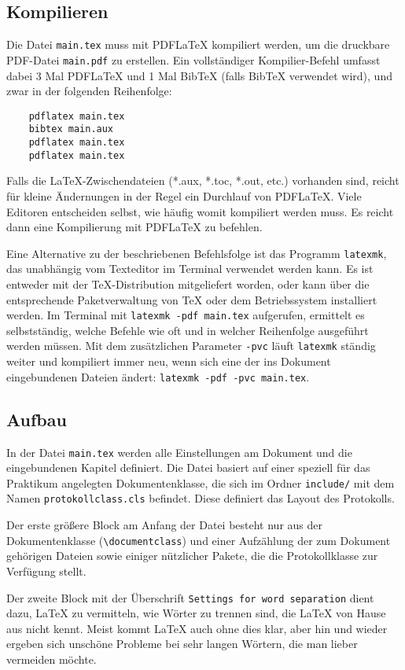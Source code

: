 \subsection{Kompilieren}
Die Datei \verb|main.tex| muss mit PDFLaTeX kompiliert werden, um die druckbare PDF-Datei \verb|main.pdf| zu erstellen. Ein vollständiger Kompilier-Befehl umfasst dabei 3 Mal PDFLaTeX und 1 Mal BibTeX (falls BibTeX verwendet wird), und zwar in der folgenden Reihenfolge:

\begin{verbatim}
	pdflatex main.tex
	bibtex main.aux
	pdflatex main.tex
	pdflatex main.tex
\end{verbatim}

Falls die LaTeX-Zwischendateien (*.aux, *.toc, *.out, etc.) vorhanden sind, reicht für kleine Ändernungen in der Regel ein Durchlauf von PDFLaTeX. Viele Editoren entscheiden selbst, wie häufig womit kompiliert werden muss. Es reicht dann eine Kompilierung mit PDFLaTeX zu befehlen.

Eine Alternative zu der beschriebenen Befehlsfolge ist das Programm
\verb|latexmk|, das unabhängig vom Texteditor im Terminal verwendet
werden kann.
Es ist entweder mit der TeX-Distribution mitgeliefert worden, oder kann über
die entsprechende Paketverwaltung von TeX oder dem Betriebssystem installiert
werden.
Im Terminal mit \verb|latexmk -pdf main.tex| aufgerufen, ermittelt es
selbstständig, welche Befehle wie oft und in welcher Reihenfolge ausgeführt
werden müssen.
Mit dem zusätzlichen Parameter \verb|-pvc| läuft \verb|latexmk| ständig weiter
und kompiliert immer neu, wenn sich eine der ins Dokument eingebundenen Dateien
ändert: \verb|latexmk -pdf -pvc main.tex|.

\subsection{Aufbau}
In der Datei \verb|main.tex| werden alle Einstellungen am Dokument und die eingebundenen Kapitel definiert. Die Datei basiert auf einer speziell für das Praktikum angelegten Dokumentenklasse, die sich im Ordner \verb|include/| mit dem Namen \verb|protokollclass.cls| befindet. Diese definiert das Layout des Protokolls.

Der erste größere Block am Anfang der Datei besteht nur aus der Dokumentenklasse (\verb|\documentclass|) und einer Aufzählung der zum Dokument gehörigen Dateien sowie einiger nützlicher Pakete, die die Protokollklasse zur Verfügung stellt.

Der zweite Block mit der Überschrift \verb|Settings for word separation| dient dazu, LaTeX zu vermitteln, wie Wörter zu trennen sind, die LaTeX von Hause aus nicht kennt. Meist kommt LaTeX auch ohne dies klar, aber hin und wieder ergeben sich unschöne Probleme bei sehr langen Wörtern, die man lieber vermeiden möchte.

